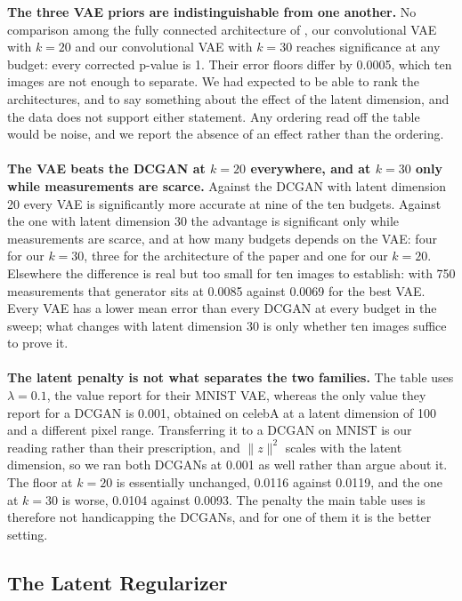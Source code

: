 \textbf{The three VAE priors are indistinguishable from one another.} No comparison among the fully connected architecture of \cite{bora2017}, our convolutional VAE with \( k = 20 \) and our convolutional VAE with \( k = 30 \) reaches significance at any budget: every corrected p-value is 1. Their error floors differ by 0.0005, which ten images are not enough to separate. We had expected to be able to rank the architectures, and to say something about the effect of the latent dimension, and the data does not support either statement. Any ordering read off the table would be noise, and we report the absence of an effect rather than the ordering.
\\\\
\textbf{The VAE beats the DCGAN at \( k = 20 \) everywhere, and at \( k = 30 \) only while measurements are scarce.} Against the DCGAN with latent dimension 20 every VAE is significantly more accurate at nine of the ten budgets. Against the one with latent dimension 30 the advantage is significant only while measurements are scarce, and at how many budgets depends on the VAE: four for our \( k = 30 \), three for the architecture of the paper and one for our \( k = 20 \). Elsewhere the difference is real but too small for ten images to establish: with 750 measurements that generator sits at 0.0085 against 0.0069 for the best VAE. Every VAE has a lower mean error than every DCGAN at every budget in the sweep; what changes with latent dimension 30 is only whether ten images suffice to prove it.
\\\\
\textbf{The latent penalty is not what separates the two families.} The table uses \( \lambda = 0.1 \), the value \cite{bora2017} report for their MNIST VAE, whereas the only value they report for a DCGAN is 0.001, obtained on celebA at a latent dimension of 100 and a different pixel range. Transferring it to a DCGAN on MNIST is our reading rather than their prescription, and \( \|z\|^2 \) scales with the latent dimension, so we ran both DCGANs at 0.001 as well rather than argue about it. The floor at \( k = 20 \) is essentially unchanged, 0.0116 against 0.0119, and the one at \( k = 30 \) is worse, 0.0104 against 0.0093. The penalty the main table uses is therefore not handicapping the DCGANs, and for one of them it is the better setting.

\subsection{The Latent Regularizer}

